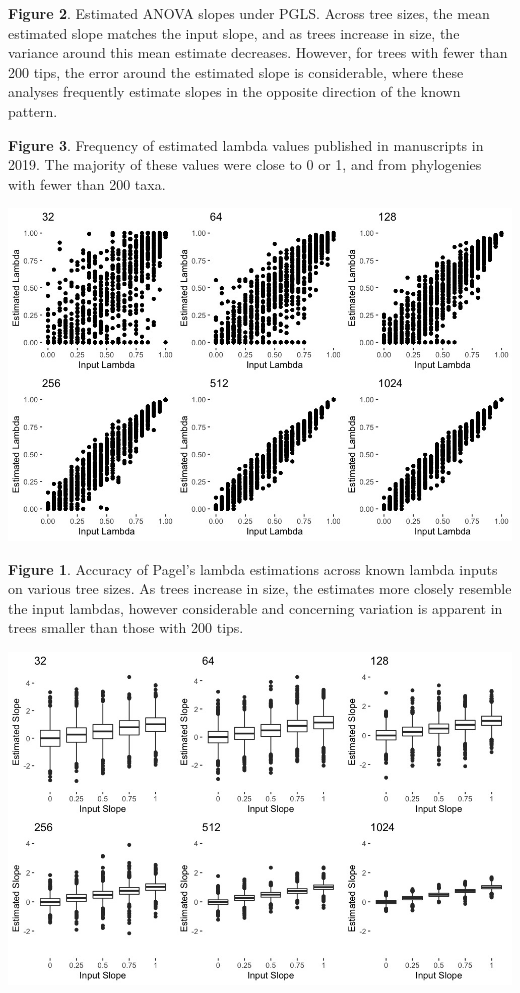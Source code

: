 \documentclass[
]{article}
\begin{document}
\textbf{Figure 2}. Estimated ANOVA slopes under PGLS. Across tree sizes,
the mean estimated slope matches the input slope, and as trees increase
in size, the variance around this mean estimate decreases. However, for
trees with fewer than 200 tips, the error around the estimated slope is
considerable, where these analyses frequently estimate slopes in the
opposite direction of the known pattern. \hfill\break

\textbf{Figure 3}. Frequency of estimated lambda values published in
manuscripts in 2019. The majority of these values were close to 0 or 1,
and from phylogenies with fewer than 200 taxa.

\newpage

\includegraphics[width=0.95\linewidth]{Fig1}

\singlespacing \textbf{Figure 1}. Accuracy of Pagel's lambda estimations
across known lambda inputs on various tree sizes. As trees increase in
size, the estimates more closely resemble the input lambdas, however
considerable and concerning variation is apparent in trees smaller than
those with 200 tips. \hfill\break

\newpage

\includegraphics[width=0.95\linewidth]{Fig2}
\end{document}
